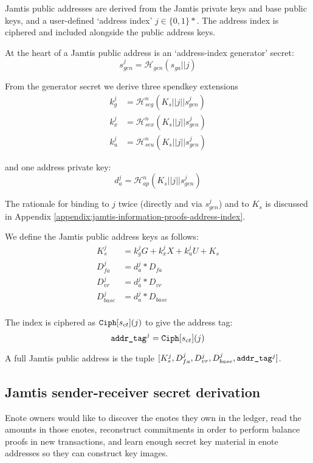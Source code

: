 Jamtis public addresses are derived from the Jamtis private keys and base public keys, and a user-defined `address index' $j \in \{0,1\}*$. The address index is ciphered and included alongside the public address keys.

At the heart of a Jamtis public address is an `address-index generator' secret:\vspace{.115cm}
\[ s^j_{gen} = \mathcal{H}_{gen}(s_{ga} || j) \]

From the generator secret we derive three spendkey extensions\vspace{.115cm}
\begin{align*}
    k^j_g &= \mathcal{H}^n_{seg}(K_s || j || s^j_{gen}) \\
    k^j_x &= \mathcal{H}^n_{sex}(K_s || j || s^j_{gen}) \\
    k^j_u &= \mathcal{H}^n_{seu}(K_s || j || s^j_{gen})
\end{align*}

and one address private key:
\[ d^j_a = \mathcal{H}^n_{ap}(K_s || j || s^j_{gen}) \]

The rationale for binding to $j$ twice (directly and via $s^j_{gen}$) and to $K_s$ is discussed in Appendix \ref{appendix:jamtis-information-proofs-address-index}.

We define the Jamtis public address keys as follows:\vspace{.115cm}
\begin{align*}
    K^j_s &= k^j_g G + k^j_x X + k^j_u U + K_s \\
    D^j_{fa}   &= d^j_a * D_{fa} \\
    D^j_{vr}   &= d^j_a * D_{vr} \\
    D^j_{base} &= d^j_a * D_{base} \\
\end{align*}

The index is ciphered as ${\tt Ciph}[s_{ct}](j)$ to give the address tag:
\[ \textrm{\tt addr\_tag}^j = {\tt Ciph}[s_{ct}](j) \]

A full Jamtis public address is the tuple $[K^j_s, D^j_{fa}, D^j_{vr}, D^j_{base}, \textrm{\tt addr\_tag}^j]$.


\subsection{Jamtis sender-receiver secret derivation}
\label{subsec:jamtis-sender-receiver-secret-derivation}

Enote owners would like to discover the enotes they own in the ledger, read the amounts in those enotes, reconstruct commitments in order to perform balance proofs in new transactions, and learn enough secret key material in enote addresses so they can construct key images.

